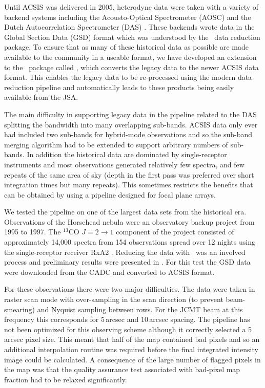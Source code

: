 \documentclass[final,authoryear,5p,times,twocolumn]{elsarticle}
\begin{document}
Until ACSIS was delivered in 2005, heterodyne data were taken with a
variety of backend systems including the Acousto-Optical Spectrometer
(AOSC) and the Dutch Autocorrelation Spectrometer (DAS)
\citep{1986SPIE..598..134B}. These backends wrote data in the
Global Section Data (GSD) format \citep[e.g.][]{GSD1999} which was
understood by the \specx\ data reduction package. To ensure that as many
of these historical data as possible are made available to the community
in a useable format, we have developed an extension to the \smurf\
package called \gsdacsis, which converts the legacy data to the
newer ACSIS data format. This enables the legacy data to be re-processed using
the modern data reduction pipeline and automatically leads to these
products being easily available from the JSA.

The main difficulty in supporting legacy data in the pipeline related
to the DAS splitting the bandwidth into many overlapping
sub-bands. ACSIS data only ever had included two sub-bands for hybrid-mode
observations and so the sub-band merging algorithm had to be
extended to support arbitrary numbers of sub-bands.  In addition the
historical data are dominated by single-receptor instruments and most
observations generated relatively few spectra, and few repeats of the
same area of sky (depth in the first pass was preferred over short
integration times but many repeats). This sometimes
restricts the benefits that can be obtained by using a pipeline
designed for focal plane arrays.

We tested the pipeline on one of the largest data sets from the
historical era. Observations of the Horsehead nebula were an
observatory backup project from 1995 to 1997. The $^{13}$CO
$J=2\rightarrow 1$ component of the project consisted of approximately
14,000 spectra from 154 observations spread over 12 nights using the
single-receptor receiver RxA2 \citep{1992IJIMW..13..647D}. Reducing
the data with \specx\ was an involved process and preliminary results
were presented in \citet{2001AAS...19915601S}. For this test the GSD data were
downloaded from the CADC and converted to ACSIS format.

For these observations there were two major difficulties. The data
were taken in raster scan mode with over-sampling in the scan
direction (to prevent beam-smearing) and Nyquist sampling between
rows. For the JCMT beam at this frequency this corresponds for
5\,arcsec and 10\,arcsec spacing. The pipeline has not been optimized
for this observing scheme although it correctly selected a 5\,arcsec
pixel size. This meant that half of the map contained bad pixels and
so an additional interpolation routine was required before the final
integrated intensity image could be calculated. A consequence of the
large number of flagged pixels in the map was that the quality
assurance test associated with bad-pixel map fraction had to be
relaxed significantly.
\end{document}
